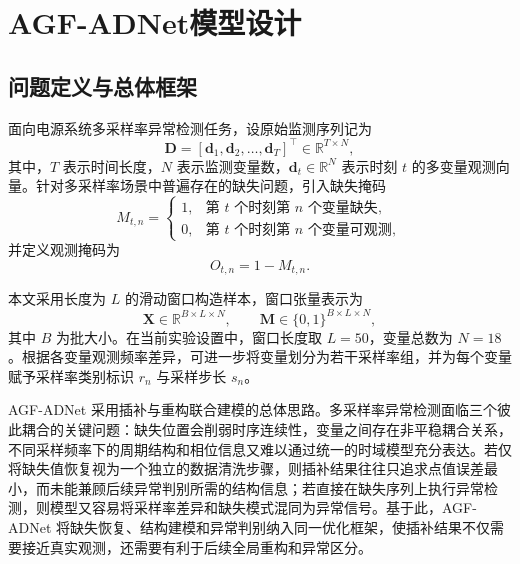 \chapter{AGF-ADNet模型设计}

\section{问题定义与总体框架}

面向电源系统多采样率异常检测任务，设原始监测序列记为
\begin{equation}
    \mathbf{D} = [\mathbf{d}_1,\mathbf{d}_2,\ldots,\mathbf{d}_T]^\top \in \mathbb{R}^{T \times N},
\end{equation}
其中，$T$ 表示时间长度，$N$ 表示监测变量数，$\mathbf{d}_t \in \mathbb{R}^{N}$ 表示时刻 $t$ 的多变量观测向量。针对多采样率场景中普遍存在的缺失问题，引入缺失掩码
\begin{equation}
    M_{t,n} =
    \begin{cases}
        1, & \text{第 $t$ 个时刻第 $n$ 个变量缺失},\\
        0, & \text{第 $t$ 个时刻第 $n$ 个变量可观测},
    \end{cases}
\end{equation}
并定义观测掩码为
\begin{equation}
    O_{t,n} = 1 - M_{t,n}.
\end{equation}

本文采用长度为 $L$ 的滑动窗口构造样本，窗口张量表示为
\begin{equation}
    \mathbf{X} \in \mathbb{R}^{B \times L \times N}, \qquad
    \mathbf{M} \in \{0,1\}^{B \times L \times N},
\end{equation}
其中 $B$ 为批大小。在当前实验设置中，窗口长度取 $L=50$，变量总数为 $N=18$。根据各变量观测频率差异，可进一步将变量划分为若干采样率组，并为每个变量赋予采样率类别标识 $r_n$ 与采样步长 $s_n$。

AGF-ADNet 采用插补与重构联合建模的总体思路。多采样率异常检测面临三个彼此耦合的关键问题：缺失位置会削弱时序连续性，变量之间存在非平稳耦合关系，不同采样频率下的周期结构和相位信息又难以通过统一的时域模型充分表达。若仅将缺失值恢复视为一个独立的数据清洗步骤，则插补结果往往只追求点值误差最小，而未能兼顾后续异常判别所需的结构信息；若直接在缺失序列上执行异常检测，则模型又容易将采样率差异和缺失模式混同为异常信号。基于此，AGF-ADNet 将缺失恢复、结构建模和异常判别纳入同一优化框架，使插补结果不仅需要接近真实观测，还需要有利于后续全局重构和异常区分。


